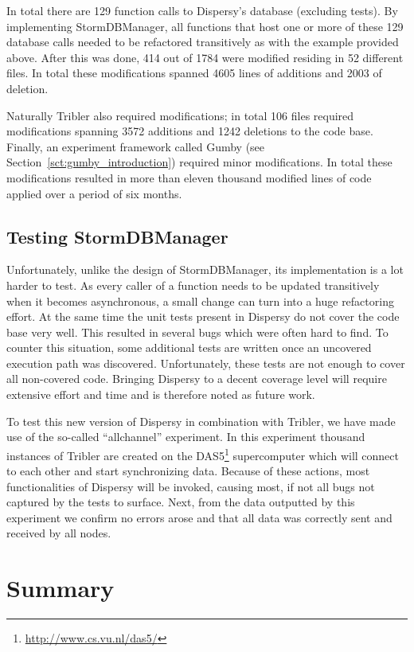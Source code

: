 In total there are 129 function calls to Dispersy's database (excluding tests).
By implementing StormDBManager, all functions that host one or more of these 129 database calls needed to be refactored transitively as with the example provided above.
After this was done, 414 out of 1784 were modified residing in 52 different files.
In total these modifications spanned 4605 lines of additions and 2003 of deletion.

Naturally Tribler also required modifications; in total 106 files required modifications spanning 3572 additions and 1242 deletions to the code base.
Finally, an experiment framework called Gumby (see Section~\ref{sct:gumby_introduction}) required minor modifications.
In total these modifications resulted in more than eleven thousand modified lines of code applied over a period of six months.

\subsection{Testing StormDBManager}

Unfortunately, unlike the design of StormDBManager, its implementation is a lot harder to test.
As every caller of a function needs to be updated transitively when it becomes asynchronous, a small change can turn into a huge refactoring effort.
At the same time the unit tests present in Dispersy do not cover the code base very well.
This resulted in several bugs which were often hard to find.
To counter this situation, some additional tests are written once an uncovered execution path was discovered.
Unfortunately, these tests are not enough to cover all non-covered code.
Bringing Dispersy to a decent coverage level will require extensive effort and time and is therefore noted as future work.
 
To test this new version of Dispersy in combination with Tribler, we have made use of the so-called \enquote{allchannel} experiment.
In this experiment thousand instances of Tribler are created on the DAS5\footnote{\url{http://www.cs.vu.nl/das5/}} supercomputer which will connect to each other and start synchronizing data.
Because of these actions, most functionalities of Dispersy will be invoked, causing most, if not all bugs not captured by the tests to surface.
Next, from the data outputted by this experiment we confirm no errors arose and that all data was correctly sent and received by all nodes.

\section{Summary}

